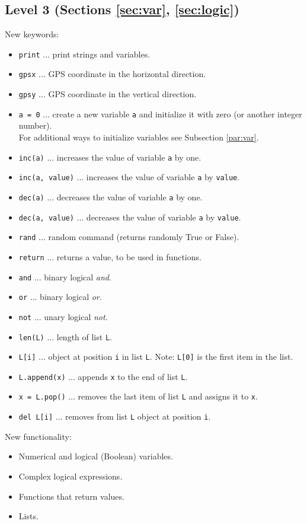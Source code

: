 \subsection{Level 3 (Sections \ref{sec:var}, \ref{sec:logic})}

New keywords:
\begin{itemize}
\item {\tt print} ... print strings and variables.
\item {\tt gpsx} ... GPS coordinate in the horizontal direction.
\item {\tt gpsy} ... GPS coordinate in the vertical direction.
\item {\tt a = 0} ... create a new variable {\tt a} and initialize it with zero (or another 
      integer number).\\ For additional ways to initialize variables see Subsection \ref{par:var}.
\item {\tt inc(a)} ... increases the value of variable {\tt a} by one.
\item {\tt inc(a, value)} ... increases the value of variable {\tt a} by {\tt value}.
\item {\tt dec(a)} ... decreases the value of variable {\tt a} by one.
\item {\tt dec(a, value)} ... decreases the value of variable {\tt a} by {\tt value}.
\item {\tt rand} ... random command (returns randomly True or False).
\item {\tt return} ... returns a value, to be used in functions.
\item {\tt and} ... binary logical {\em and}.
\item {\tt or} ... binary logical {\em or}.
\item {\tt not} ... unary logical {\em not}.
\item {\tt len(L)} ... length of list {\tt L}.
\item {\tt L[i]} ... object at position {\tt i} in list {\tt L}. Note: {\tt L[0]} is the first item in the list.
\item {\tt L.append(x)} ... appends {\tt x} to the end of list {\tt L}.
\item {\tt x = L.pop()} ... removes the last item of list {\tt L} and assigns it to {\tt x}.
\item {\tt del L[i]} ... removes from list {\tt L} object at position {\tt i}. 
\end{itemize}
New functionality:
\begin{itemize}
\item Numerical and logical (Boolean) variables.
\item Complex logical expressions.
\item Functions that return values.
\item Lists.
\end{itemize}
